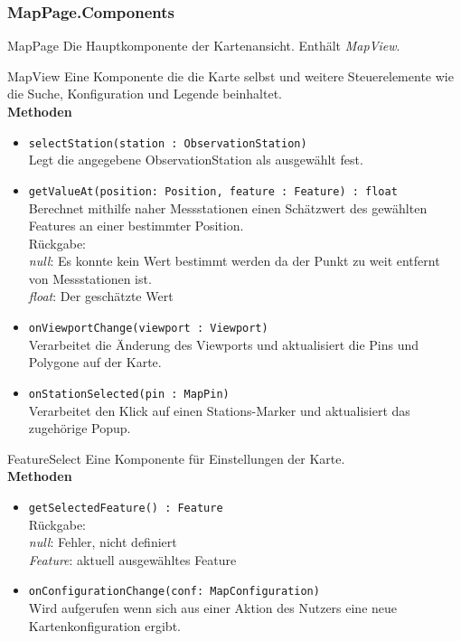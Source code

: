 \subsubsection{MapPage.Components}
    \begin{Class}{MapPage}
        Die Hauptkomponente der Kartenansicht. Enthält \emph{MapView}.
    \end{Class}
    \begin{Class}{MapView}
        Eine Komponente die die Karte selbst und weitere Steuerelemente wie die Suche, Konfiguration und Legende beinhaltet.
        \bigskip\\
        \textbf{Methoden}
        \begin{itemize}
            \item \texttt{selectStation(station : ObservationStation)}
            \\ Legt die angegebene ObservationStation als ausgewählt fest.
            \item \texttt{getValueAt(position: Position, feature : Feature) : float}
            \\ Berechnet mithilfe naher Messstationen einen Schätzwert des gewählten Features an einer bestimmter Position.
            \\ Rückgabe:
            \\ \emph{null}: Es konnte kein Wert bestimmt werden da der Punkt zu weit entfernt von Messstationen ist.
            \\ \emph{float}: Der geschätzte Wert
            \item \texttt{onViewportChange(viewport : Viewport)}
            \\ Verarbeitet die Änderung des Viewports und aktualisiert die Pins und Polygone auf der Karte.
            \item \texttt{onStationSelected(pin : MapPin)}
            \\ Verarbeitet den Klick auf einen Stations-Marker und aktualisiert das zugehörige Popup.
        \end{itemize}
    \end{Class}

    \begin{Class}{FeatureSelect}
        Eine Komponente für Einstellungen der Karte.
        \bigskip\\
        \textbf{Methoden}
        \begin{itemize}
            \item \texttt{getSelectedFeature() : Feature}
            \\ Rückgabe:
            \\ \emph{null}: Fehler, nicht definiert
            \\ \emph{Feature}: aktuell ausgewähltes Feature
            \item \texttt{onConfigurationChange(conf: MapConfiguration)}
            \\ Wird aufgerufen wenn sich aus einer Aktion des Nutzers eine neue Kartenkonfiguration ergibt.
        \end{itemize}
    \end{Class}

